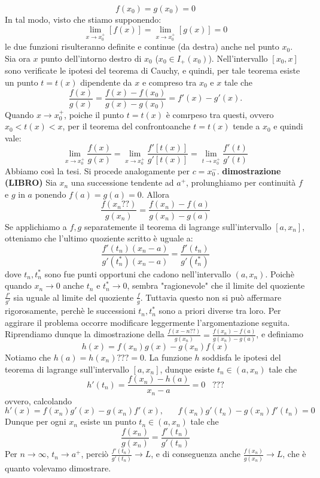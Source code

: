 \documentclass[a4paper, 9pt]{report}
\begin{document}
\[
    f(x_0) = g(x_0) = 0
\]
In tal modo, visto che stiamo supponendo:
\[
    \lim_{x\rightarrow x_0^+} [f(x)] = \lim_{x\rightarrow x_0^+}[g(x)] = 0
\]
le due funzioni risulteranno definite e continue (da destra) anche nel punto $x_0$.\newline
Sia ora $x$ punto dell'intorno destro di $x_0$ ($x_0 \in I_+(x_0)$).\newline
Nell'intervallo $[x_0, x]$ sono verificate le ipotesi del teorema di Cauchy, e quindi, per tale teorema esiste un punto $t= t(x)$ dipendente da $x$ e compreso tra $x_0$ e $x$ tale che 
\[
    \frac{f(x)}{g(x)} = \frac{f(x) - f(x_0)}{g(x) -g(x_0)} = f'(x) - g'(x).
\]
Quando $x \rightarrow x_0^+$, poiche il punto $t=t(x)$ è comrpeso tra questi, ovvero $x_0 < t(x) < x$, per il teorema del confrontoanche $t= t(x)$ tende a $x_0$ e quindi vale:
\[
    \lim_{x\rightarrow x_0^+} \frac{f(x)}{g(x)} = \lim_{x\rightarrow x_0^+}\frac{f'[t(x)]}{g'[t(x)]} = \lim_{t\rightarrow x_0^+} \frac{f'(t)}{g'(t)}
\]
Abbiamo così la tesi.\newline
Si procede analogamente per $c=x_0^-$.\newline
\textbf{dimostrazione (LIBRO)}\newline
Sia $x_n$ una successione tendente ad $a^+$, prolunghiamo per continuità $f$ e $g$ in $a$ ponendo $f(a) = g(a) = 0$. Allora
\[
    \frac{f(x_n??)}{g(x_n)} = \frac{f(x_n) -f(a)}{g(x_n)-g(a)}
\]
Se applichiamo a $f,g$ separatemente il teorema di lagrange sull'intervallo $[a, x_n]$, otteniamo che l'ultimo quoziente scritto è uguale a:
\[
    \frac{f'(t_n)(x_n -a)}{g'(t_n^*)(x_n-a)} = \frac{f'(t_n)}{g'(t_n^*)}
\]
dove $t_n, t_n^*$ sono fue punti opportuni che cadono nell'intervallo $(a,x_n)$. Poichè quando $x_n \rightarrow 0$ anche $t_n$ e $t_n^*\rightarrow 0$, sembra "ragionevole" che il limite del quoziente $\frac{f'}{g'}$ sia uguale al limite del quoziente $\frac{f}{g}$. Tuttavia questo non si può affermare rigorosamente, perchè le successioni $t_n, t_n^*$ sono a priori diverse tra loro. Per aggirare il problema occorre modificare leggermente l'argomentazione seguita. Riprendiamo dunque la dimostrazione della $\frac{f(x-n??)}{g(x_n)} = \frac{f(x_n) -f(a)}{g(x_n)-g(a)}$, e definiamo
\[
    h(x) = f(x_n) g(x) - g(x_n) f(x)
\]
Notiamo che $h(a) = h(x_n)??? = 0$. La funzione $h$ soddisfa le ipotesi del teorema di lagrange sull'intervallo $[a,x_n]$, dunque esiste $t_n \in(a,x_n)$ tale che 
\[
    h'(t_n) = \frac{f(x_n) - h(a)}{x_n-a} = 0  \;\;\;???
\]
ovvero, calcolando
\[
    h'(x) = f(x_n)g'(x) -g(x_n) f'(x), \;\;\;\;\;\; f(x_n)g'(t_n)-g(x_n)f'(t_n) = 0
\]
Dunque per ogni $x_n$ esiste un punto $t_n \in (a,x_n)$ tale che 
\[
    \frac{f(x_n)}{g(x_n)} = \frac{f'(t_n)}{g'(t_n)}
\]
Per $n \rightarrow  \infty$, $t_n \rightarrow a^+$, perciò $\frac{f'(t_n)}{g'(t_n)} \rightarrow L$, e di conseguenza anche $\frac{f(x_n)}{g(x_n)} \rightarrow L$, che è quanto volevamo dimostrare.
\end{document}
